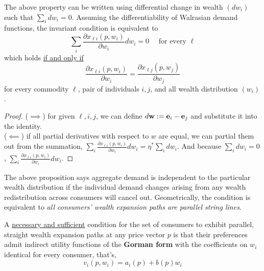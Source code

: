 \documentclass{report}
\begin{document}
	 		\begin{proposition}
	 			The above property can be written using differential change in wealth $(d w_i)$ such that $\sum_i d w_i = 0$. Assuming the differentiability of Walrasian demand functions, the invariant condition is equivalent to 
	 			\begin{equation}
	 				\sum_{i} \frac{\partial x_{\ell i}\left(p, w_{i}\right)}{\partial w_{i}} d w_{i}=0 \quad \text { for every } \ell
	 			\end{equation}
	 			which holds \ul{if and only if}
	 			\begin{equation}
	 				\frac{\partial x_{\ell i}\left(p, w_{i}\right)}{\partial w_{i}}=\frac{\partial x_{\ell j}\left(p, w_{j}\right)}{\partial w_{j}}
	 			\end{equation}
	 			for every commodity $\ell$, pair of individuals $i, j$, and all wealth distribution $(w_i)$.
	 		\end{proposition}
	 		
	 		\begin{proof}
	 			($\implies$) for given $\ell, i, j$, we can define $d\textbf{w} := \textbf{e}_i - \textbf{e}_j$ and substitute it into the identity. \\
	 			($\impliedby$) if all partial derivatives with respect to $w$ are equal, we can partial them out from the summation, $\sum_{i} \frac{\partial x_{\ell i}\left(p, w_{i}\right)}{\partial w_{i}} d w_{i} = \eta^* \sum_i dw_i$. And because $\sum_i dw_i = 0$, $\sum_{i} \frac{\partial x_{\ell i}\left(p, w_{i}\right)}{\partial w_{i}} d w_{i}$.
	 		\end{proof}
	 		
	 		\begin{remark}
	 			The above proposition says aggregate demand is independent to the particular wealth distribution if the individual demand changes arising from any wealth redistribution across consumers will cancel out. Geometrically, the condition is equivalent to \emph{all consumers' wealth expansion paths are parallel string lines}.
	 		\end{remark}
	 		
	 		\begin{proposition}[4.B.1]
	 			A \ul{necessary and sufficient} condition for the set of consumers to exhibit parallel, straight wealth expansion paths at any price vector $p$ is that their preferences admit indirect utility functions of the \textbf{Gorman form} with the coefficients on $w_i$ identical for every consumer, that's,
	 			\begin{equation}
	 				v_{i}\left(p, w_{i}\right)=a_{i}(p)+b(p) w_{i}
	 			\end{equation}
	 		\end{proposition}
	 		
\end{document}
